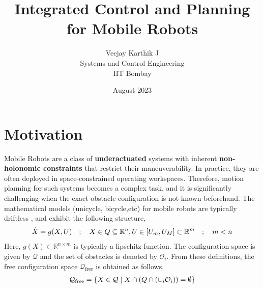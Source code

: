 \documentclass{article}
\begin{document}
\title{Integrated Control and Planning for Mobile Robots}
\author{Veejay Karthik J\\
Systems and Control Engineering\\
IIT Bombay}
\date{August 2023}


\maketitle

\section{Motivation}

Mobile Robots are a class of \textbf{underactuated} systems with inherent \textbf{non-holonomic constraints} that restrict their maneuverability. In practice, they are often deployed in space-constrained operating workspaces. Therefore, motion planning for such systems becomes a complex task, and it is significantly challenging when the exact obstacle configuration is not known beforehand. The mathematical models (unicycle, bicycle,etc) for mobile robots are typically driftless , and exhibit the following structure,
\begin{align}
\label{eqn:SystemDescription}
\centering
\dot{X} = g(X,U) \quad;\quad X \in Q \subseteq \mathbb{R}^n, U\in [U_m,U_M]\subset\mathbb{R}^m \quad;\quad m < n
\end{align}
Here, $g(X)\in \mathbb{R}^{n\times m}$ is typically a lipschitz function. The configuration space is given by $\mathcal{Q}$ and the set of obstacles is denoted by $\mathcal{O}_i$. From these definitions, the free configuration space $\mathcal{Q}_{\text{free}}$ is obtained as follows,
\begin{align}
    \label{eqn:FreeWorkspaces}
    \centering
    
    \mathcal{Q}_{\text{free}} = \{X\in\mathcal{Q}\;|\; X\cap\left(Q\cap (\cup_i \mathcal{O}_i)\right) = \emptyset \}
\end{align}
\end{document}
